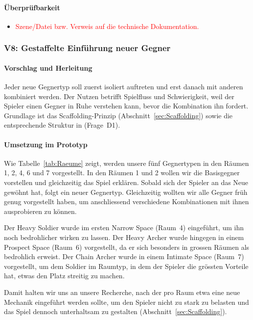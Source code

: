 \documentclass[../Main.tex]{subfiles}
\begin{document}
\paragraph{Überprüfbarkeit}
\begin{itemize}[leftmargin=1.5cm]
    \item \textcolor{red}{Szene/Datei bzw. Verweis auf die technische Dokumentation.}
\end{itemize}

\subsubsection{V8: Gestaffelte Einführung neuer Gegner} \label{sec:V8}

\paragraph{Vorschlag und Herleitung}
Jeder neue Gegnertyp soll zuerst isoliert auftreten und erst danach mit anderen kombiniert werden. Der Nutzen betrifft Spielfluss und Schwierigkeit, weil der Spieler einen Gegner in Ruhe verstehen kann, bevor die Kombination ihn fordert. Grundlage ist das Scaffolding-Prinzip (Abschnitt~\ref{sec:Scaffolding}) sowie die entsprechende Struktur in  (Frage~D1).

\paragraph{Umsetzung im Prototyp}
Wie Tabelle~\ref{tab:Raeume} zeigt, werden unsere fünf Gegnertypen in den Räumen 1, 2, 4, 6 und 7 vorgestellt. In den Räumen 1 und 2 wollen wir die Basisgegner vorstellen und gleichzeitig das Spiel erklären. Sobald sich der Spieler an das Neue gewöhnt hat, folgt ein neuer Gegnertyp. Gleichzeitig wollten wir alle Gegner früh genug vorgestellt haben, um anschliessend verschiedene Kombinationen mit ihnen ausprobieren zu können.

Der Heavy Soldier wurde im ersten Narrow Space (Raum~4) eingeführt, um ihn noch bedrohlicher wirken zu lassen. Der Heavy Archer wurde hingegen in einem Prospect Space (Raum~6) vorgestellt, da er sich besonders in grossen Räumen als bedrohlich erweist. Der Chain Archer wurde in einem Intimate Space (Raum~7) vorgestellt, um dem Soldier im Raumtyp, in dem der Spieler die grössten Vorteile hat, etwas den Platz streitig zu machen.

Damit halten wir uns an unsere Recherche, nach der pro Raum etwa eine neue Mechanik eingeführt werden sollte, um den Spieler nicht zu stark zu belasten und das Spiel dennoch unterhaltsam zu gestalten (Abschnitt~\ref{sec:Scaffolding}).
\end{document}
